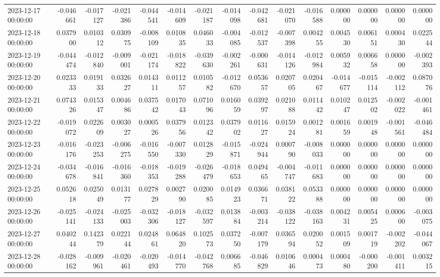 \begin{tabular}{lrrrrrrrrrrrrrr}
2023-12-17 00:00:00 & -0.046661 & -0.017127 & -0.021386 & -0.044541 & -0.014609 & -0.021187 & -0.014098 & -0.042681 & -0.021070 & -0.016588 & 0.000000 & 0.000000 & 0.000000 & 0.000000 \\
2023-12-18 00:00:00 & 0.037900 & 0.010312 & 0.030975 & -0.008109 & 0.010835 & 0.046033 & -0.004085 & -0.012537 & -0.007398 & 0.004255 & 0.004530 & 0.006151 & 0.000430 & 0.022544 \\
2023-12-19 00:00:00 & -0.044474 & -0.012840 & -0.009001 & -0.021174 & -0.018822 & -0.039630 & -0.002261 & -0.000631 & -0.014126 & -0.012984 & 0.005932 & 0.006658 & 0.000000 & -0.002393 \\
2023-12-20 00:00:00 & 0.023333 & 0.019133 & 0.032627 & 0.014311 & 0.011257 & 0.010582 & -0.012670 & 0.053657 & 0.020705 & 0.020467 & -0.014677 & -0.015114 & -0.002112 & 0.087076 \\
2023-12-21 00:00:00 & 0.074326 & 0.015347 & 0.004686 & 0.037542 & 0.017043 & 0.071096 & 0.016059 & 0.039297 & 0.021088 & 0.011442 & 0.010247 & 0.012502 & -0.002022 & -0.001461 \\
2023-12-22 00:00:00 & -0.019072 & 0.022609 & 0.003027 & 0.000526 & 0.037956 & 0.012342 & 0.037902 & 0.011627 & 0.015924 & 0.001281 & 0.001659 & 0.001948 & -0.001561 & -0.046484 \\
2023-12-23 00:00:00 & -0.016176 & -0.023253 & -0.006275 & -0.016550 & -0.007330 & 0.012829 & -0.015871 & -0.024944 & 0.000790 & -0.008033 & 0.000000 & 0.000000 & 0.000000 & 0.000000 \\
2023-12-24 00:00:00 & -0.034678 & -0.016841 & -0.016360 & -0.018353 & -0.019288 & -0.026479 & -0.018653 & 0.049465 & -0.004747 & -0.011683 & 0.000000 & 0.000000 & 0.000000 & 0.000000 \\
2023-12-25 00:00:00 & 0.052618 & 0.025049 & 0.013177 & 0.027829 & 0.002790 & 0.020085 & 0.014923 & 0.036671 & 0.038122 & 0.053388 & 0.000000 & 0.000000 & 0.000000 & 0.000000 \\
2023-12-26 00:00:00 & -0.025141 & -0.024133 & -0.025003 & -0.032306 & -0.018127 & -0.032597 & 0.013884 & -0.003214 & -0.038122 & -0.038163 & 0.004231 & 0.005425 & 0.000600 & -0.003075 \\
2023-12-27 00:00:00 & 0.040244 & 0.142379 & 0.022144 & 0.024861 & 0.064820 & 0.102573 & 0.037250 & -0.007179 & 0.036594 & 0.020052 & 0.001509 & 0.001719 & -0.002202 & -0.044067 \\
2023-12-28 00:00:00 & -0.028162 & -0.009961 & -0.020461 & -0.020493 & -0.014770 & -0.042768 & 0.006685 & -0.046829 & 0.010646 & 0.000473 & 0.000480 & -0.000200 & -0.001411 & 0.003215 \\

\end{tabular}
